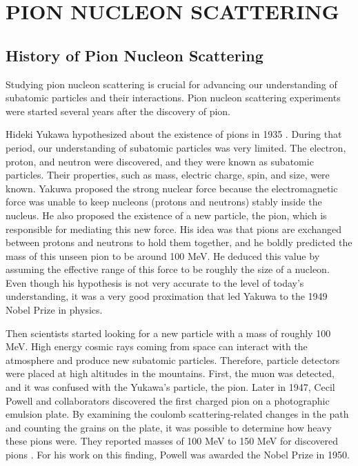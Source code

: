 \chapter{PION NUCLEON SCATTERING}



\section{History of Pion Nucleon Scattering}

Studying pion nucleon scattering is crucial for advancing our understanding of subatomic particles and their interactions. Pion nucleon scattering experiments were started several years after the discovery of pion.

Hideki Yukawa hypothesized about the existence of pions in 1935 \cite{Yukawa:1935xg}. During that period, our understanding of subatomic particles was very limited. The electron, proton, and neutron were discovered, and they were known as subatomic particles. Their properties, such as mass, electric charge, spin, and size, were known. Yakuwa proposed the strong nuclear force because the electromagnetic force was unable to keep nucleons (protons and neutrons) stably inside the nucleus. He also proposed the existence of a new particle, the pion, which is responsible for mediating this new force. His idea was that pions are exchanged between protons and neutrons to hold them together, and he boldly predicted the mass of this unseen pion to be around 100 MeV. He deduced this value by assuming the effective range of this force to be roughly the size of a nucleon. Even though his hypothesis is not very accurate to the level of today's understanding, it was a very good proximation that led Yakuwa to the 1949 Nobel Prize in physics.

Then scientists started looking for a new particle with a mass of roughly 100 MeV. High energy cosmic rays coming from space can interact with the atmosphere and produce new subatomic particles. Therefore, particle detectors were placed at high altitudes in the mountains. First, the muon was detected, and it was confused with the Yukawa's particle, the pion. Later in 1947, Cecil Powell and collaborators discovered the first charged pion \cite{Lattes1947ProcessesIC} on a photographic emulsion plate. By examining the coulomb scattering-related changes in the path and counting the grains on the plate, it was possible to determine how heavy these pions were. They reported masses of 100 MeV to 150 MeV for discovered pions \cite{CFPowell_1950}. For his work on this finding, Powell was awarded the Nobel Prize in 1950.

